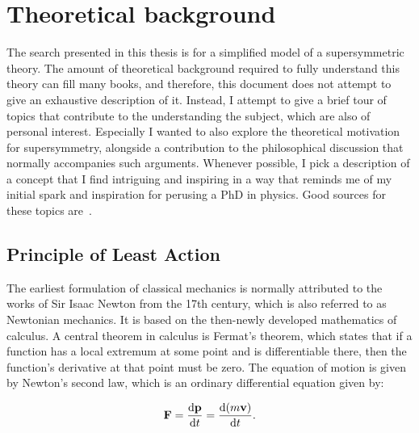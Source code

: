 \chapter{Theoretical background}

The search presented in this thesis is for a simplified model of a supersymmetric theory. The amount of theoretical background required to fully understand  this theory can fill many books, and therefore, this document does not attempt to give an exhaustive description of it. Instead, I attempt to give a brief tour of topics that contribute to the understanding the subject, which are also of personal interest. Especially I wanted to also explore the theoretical motivation for supersymmetry, alongside a contribution to the philosophical discussion that normally accompanies such arguments. Whenever possible, I pick a description of a concept that I find intriguing and inspiring in a way that reminds me of my initial spark and inspiration for perusing a PhD in physics. Good sources for these topics are~\cite{Peskin2019-bt,Srednicki2007-mn}.

\section{Principle of Least Action}
\label{sec:least-action}
The earliest formulation of classical mechanics is normally attributed to the works of Sir Isaac Newton from the 17th century, which is also referred to as Newtonian mechanics. It is based on the then-newly developed mathematics of calculus. A central theorem in calculus is Fermat's theorem, which states that if a function has a local extremum at some point and is differentiable there, then the function's derivative at that point must be zero. The equation of motion is given by Newton's second law, which is an ordinary differential equation given by:

\begin{equation}
\vb{F}=\dv{\vb{p}}{t}=\dv{(m\vb{v})}{t}.
\label{eq:newton-second-law}
\end{equation}

